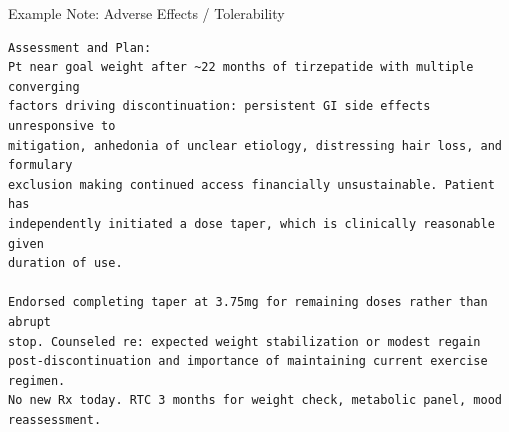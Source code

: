 \documentclass[aspectratio=169]{beamer}
\begin{document}
\begin{frame}{Example Note: Adverse Effects / Tolerability}
\begin{verbatim}
Assessment and Plan:
Pt near goal weight after ~22 months of tirzepatide with multiple converging
factors driving discontinuation: persistent GI side effects unresponsive to
mitigation, anhedonia of unclear etiology, distressing hair loss, and formulary
exclusion making continued access financially unsustainable. Patient has
independently initiated a dose taper, which is clinically reasonable given
duration of use.

Endorsed completing taper at 3.75mg for remaining doses rather than abrupt
stop. Counseled re: expected weight stabilization or modest regain
post-discontinuation and importance of maintaining current exercise regimen.
No new Rx today. RTC 3 months for weight check, metabolic panel, mood
reassessment.
\end{verbatim}
\end{frame}
\end{document}
